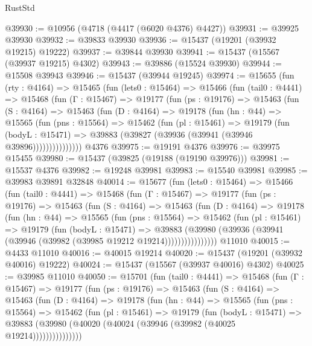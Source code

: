 \begin{lexlean}{RustStd}
\begin{coremodule}
@39930 := @10956 (@4718 (@4417 (@6020 @4376) @4427))
@39931 := @39925 @39930
@39932 := @39833 @39930
@39936 := @15437 (@19201 (@39932 @19215) @19222)
@39937 := @39844 @39930
@39941 := @15437 (@15567 (@39937 @19215) @4302)
@39943 := @39886 (@15524 @39930)
@39944 := @15508 @39943
@39946 := @15437 (@39944 @19245)
@39974 := @15655
    (fun (rty : @4164) =>
    @15465
      (fun (lets0 : @15464) =>
      @15466
        (fun (tail0 : @4441) =>
        @15468
          (fun (Γ : @15467) =>
          @19177
            (fun (ps : @19176) =>
            @15463
              (fun (S : @4164) =>
              @15463
                (fun (D : @4164) =>
                @19178
                  (fun (hn : @44) =>
                  @15565
                    (fun (pns : @15564) =>
                    @15462
                      (fun (pl : @15461) =>
                      @19179
                        (fun (bodyL : @15471) =>
                        @39883 (@39827 (@39936 (@39941 (@39946 @39896)))))))))))))))
    @4376
@39975 := @19191 @4376
@39976 := @39975 @15455
@39980 := @15437 (@39825 (@19188 (@19190 @39976)))
@39981 := @15537 @4376
@39982 := @19248 @39981
@39983 := @15540 @39981
@39985 := @39983 @39891 @32848
@40014 := @15677
    (fun (lets0 : @15464) =>
    @15466
      (fun (tail0 : @4441) =>
      @15468
        (fun (Γ : @15467) =>
        @19177
          (fun (ps : @19176) =>
          @15463
            (fun (S : @4164) =>
            @15463
              (fun (D : @4164) =>
              @19178
                (fun (hn : @44) =>
                @15565
                  (fun (pns : @15564) =>
                  @15462
                    (fun (pl : @15461) =>
                    @19179
                      (fun (bodyL : @15471) =>
                      @39883
                        (@39980
                          (@39936 (@39941 (@39946 (@39982 (@39985 @19212 @19214))))))))))))))))
    @11010
@40015 := @4433 @11010
@40016 := @40015 @19214
@40020 := @15437 (@19201 (@39932 @40016) @19222)
@40024 := @15437 (@15567 (@39937 @40016) @4302)
@40025 := @39985 @11010
@40050 := @15701
    (fun (tail0 : @4441) =>
    @15468
      (fun (Γ : @15467) =>
      @19177
        (fun (ps : @19176) =>
        @15463
          (fun (S : @4164) =>
          @15463
            (fun (D : @4164) =>
            @19178
              (fun (hn : @44) =>
              @15565
                (fun (pns : @15564) =>
                @15462
                  (fun (pl : @15461) =>
                  @19179
                    (fun (bodyL : @15471) =>
                    @39883 (@39980 (@40020 (@40024 (@39946 (@39982 (@40025 @19214)))))))))))))))

\end{coremodule}
\end{lexlean}
